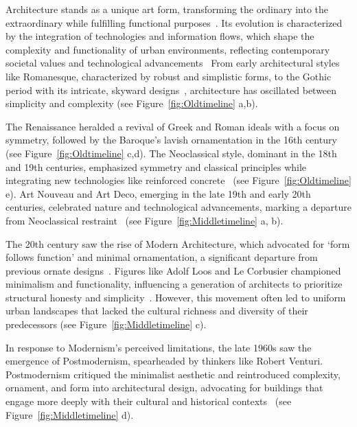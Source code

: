
Architecture stands as a unique art form, transforming the ordinary into the extraordinary while fulfilling functional purposes~\cite{Jiang2023}.
Its evolution is characterized by the integration of technologies and information flows, which shape the complexity and functionality of urban environments, reflecting contemporary societal values and technological advancements~\cite{Leach2015}
From early architectural styles like Romanesque, characterized by robust and simplistic forms, to the Gothic period with its intricate, skyward designs~\cite{Kennedy2013}, architecture has oscillated between simplicity and complexity (see Figure~\ref{fig:Oldtimeline} a,b).

The Renaissance heralded a revival of Greek and Roman ideals with a focus on symmetry, followed by the Baroque's lavish ornamentation in the 16th century~\cite{Marder1990} (see Figure~\ref{fig:Oldtimeline} c,d).
The Neoclassical style, dominant in the 18th and 19th centuries, emphasized symmetry and classical principles while integrating new technologies like reinforced concrete~\cite{Adebusuyi2022} (see Figure~\ref{fig:Oldtimeline} e).
Art Nouveau and Art Deco, emerging in the late 19th and early 20th centuries, celebrated nature and technological advancements, marking a departure from Neoclassical restraint~\cite{Salas2018} (see Figure~\ref{fig:Middletimeline} a, b).

The 20th century saw the rise of Modern Architecture, which advocated for `form follows function' and minimal ornamentation, a significant departure from previous ornate designs~\cite{Leach2016}.
Figures like Adolf Loos and Le Corbusier championed minimalism and functionality, influencing a generation of architects to prioritize structural honesty and simplicity~\cite{Saglam2014}.
However, this movement often led to uniform urban landscapes that lacked the cultural richness and diversity of their predecessors (see Figure~\ref{fig:Middletimeline} c).

In response to Modernism's perceived limitations, the late 1960s saw the emergence of Postmodernism, spearheaded by thinkers like Robert Venturi.
Postmodernism critiqued the minimalist aesthetic and reintroduced complexity, ornament, and form into architectural design, advocating for buildings that engage more deeply with their cultural and historical contexts~\cite{Venturi1972} (see Figure~\ref{fig:Middletimeline} d).

